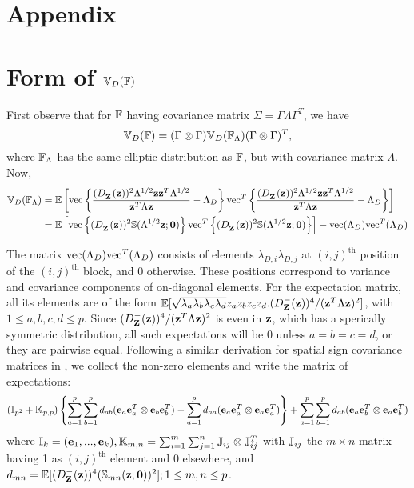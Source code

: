 
\appendix
\section*{Appendix}
\section{\textbf{Form of ${\mathbb{V}}_D({\mathbb{F}})$}}
\label{section:appA}
First observe that for ${\mathbb{F}}$ having covariance matrix $\Sigma = \Gamma\Lambda\Gamma^T$, we have
%
$$
{\mathbb{V}}_D({\mathbb{F}})  = (\Gamma \otimes \Gamma) {\mathbb{V}}_D ({\mathbb{F}}_\Lambda) (\Gamma \otimes \Gamma)^T,
$$
%
where ${\mathbb{F}}_\Lambda$ has the same elliptic distribution as ${\mathbb{F}}$, but with covariance matrix $\Lambda$. Now,
%
\begin{align*}
{\mathbb{V}}_D ({\mathbb{F}}_\Lambda) &= {\mathbb{E}} \left[ \operatorname*{vec} \left\{ \frac{(D^-_{\mathbf{Z}} ({\bf{z}}))^2 \Lambda^{1/2} {\bf{z}}{\bf{z}}^T \Lambda^{1/2}}{{\bf{z}}^T\Lambda{\bf{z}}} - \Lambda_D \right\} {\operatorname*{vec}}^T \left\{ \frac{(D^-_{\mathbf{Z}} ({\bf{z}}))^2 \Lambda^{1/2} {\bf{z}}{\bf{z}}^T \Lambda^{1/2}}{{\bf{z}}^T\Lambda{\bf{z}}} - \Lambda_{D} \right\} \right]\\
&= {\mathbb{E}} \left[ \operatorname*{vec} \left\{ (D^-_{\mathbf{Z}} ({\bf{z}}))^2 {\mathbb{S}} (\Lambda^{1/2}{\bf{z}}; \bf0) \right\} {\operatorname*{vec}}^T \left\{ (D^-_{\mathbf{Z}} ({\bf{z}}))^2 {\mathbb{S}} (\Lambda^{1/2}{\bf{z}}; \bf0) \right\} \right]
- \operatorname*{vec}(\Lambda_{D}) {\operatorname*{vec}}^T(\Lambda_{D})
\end{align*}

The matrix $\operatorname*{vec} (\Lambda_{D}) {\operatorname*{vec}}^T(\Lambda_{D})$ consists of elements $\lambda_{D,i} \lambda_{D,j}$ at $(i,j)^\text{th}$ position of the $(i,j)^\text{th}$ block, and 0 otherwise. These positions correspond to variance and covariance components of on-diagonal elements. For the expectation matrix, all its elements are of the form $ {\mathbb{E}} [\sqrt{\lambda_a \lambda_b \lambda_c \lambda_d} z_a z_b z_c z_d . (D^-_{\mathbf{Z}} ({\bf{z}}))^4 / ({\bf{z}}^T \Lambda {\bf{z}})^2]$, with $1 \leq a,b,c,d \leq p$. Since $(D^-_{\mathbf{Z}} ({\bf{z}}))^4 / ({\bf{z}}^T \Lambda {\bf{z}})^2$ is even in ${\bf{z}}$, which has a sperically symmetric distribution, all such expectations will be 0 unless $a = b = c = d$, or they are pairwise equal. Following a similar derivation for spatial sign covariance matrices in \cite{magyar14}, we collect the non-zero elements and write the matrix of expectations:
%
$$
({\mathbb{I}}_{p^2} + {\mathbb{K}}_{p,p}) \left\{ \sum_{a=1}^p \sum_{b=1}^p d_{ab} ({\bf{e}}_a {\bf{e}}_a^T \otimes  {\bf{e}}_b {\bf{e}}_b^T) - \sum_{a=1}^p d_{aa} ({\bf{e}}_a {\bf{e}}_a^T \otimes  {\bf{e}}_a {\bf{e}}_a^T) \right\} + \sum_{a=1}^p \sum_{b=1}^p d_{ab} ({\bf{e}}_a {\bf{e}}_b^T \otimes  {\bf{e}}_a {\bf{e}}_b^T) $$
%
where ${\mathbb{I}}_k = ({\bf{e}}_1,...,{\bf{e}}_k), {\mathbb{K}}_{m,n} = \sum_{i=1}^m \sum_{j=1}^n {\mathbb{J}}_{ij} \otimes {\mathbb{J}}_{ij}^T$ with ${\mathbb{J}}_{ij}$ the $m \times n$ matrix having 1 as $(i,j)^\text{th}$ element and 0 elsewhere, and $d_{mn} = {\mathbb{E}} [ (D^-_{\mathbf{Z}} ({\bf{z}}))^4 ({\mathbb{S}}_{mn}({\bf{z}}; {\bf 0}))^2]; 1 \leq m,n \leq p$.

